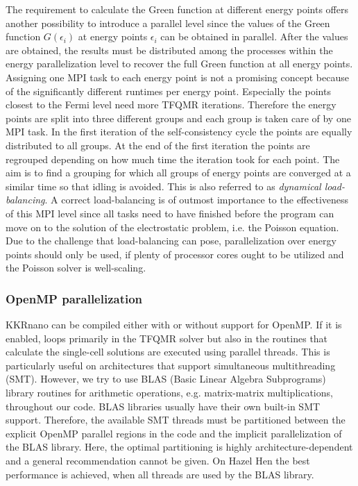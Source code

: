 \documentclass[graybox]{svmult}
\begin{document}
The requirement to calculate the Green function at different energy points offers another possibility to
introduce a parallel level since the values of the Green function $G(\epsilon_i)$ at energy points $\epsilon_i$
can be obtained in parallel.
After the values are obtained, the results must be distributed among the processes within
the energy parallelization level to recover the full Green function at all energy points.
Assigning one MPI task to each energy point is not a promising concept because
of the significantly different runtimes per energy point. Especially the points closest to the
Fermi level 
need more TFQMR iterations.
Therefore the energy points are split into three different groups and each group is taken care of by
one MPI task.
In the first iteration of the self-consistency cycle the points are equally distributed to all
groups. At the end of the first iteration the points are regrouped depending on how much time the iteration took
for each point. The aim is to find a grouping for which all groups of energy points are converged at
a similar time so that idling is avoided. This is also referred to as \textit{dynamical load-balancing}.
A correct load-balancing is of outmost importance to the effectiveness of this MPI level since
all tasks need to have finished before the program can move on to the solution of the electrostatic problem,
i.e. the Poisson equation.
Due to the challenge that load-balancing can pose, parallelization over energy points should only be used, 
if plenty of processor cores
ought to be utilized and the Poisson solver is well-scaling.

\subsubsection*{OpenMP parallelization}

KKRnano can be compiled either with or without support for OpenMP.
If it is enabled,
loops primarily in the TFQMR solver but also in the routines that calculate the single-cell
solutions are executed using parallel threads. 
This is particularly useful on architectures that support simultaneous multithreading (SMT).
However, we try to use BLAS (Basic Linear Algebra Subprograms) library routines for arithmetic
operations, e.g. matrix-matrix multiplications, throughout our code. BLAS libraries usually
have their own built-in SMT support.
Therefore, the available SMT threads must be partitioned between the explicit OpenMP 
parallel regions in the code and the implicit parallelization of the BLAS library.
Here, the optimal partitioning is highly architecture-dependent and a general recommendation cannot
be given. On Hazel Hen the best performance is achieved, when all threads are used by the BLAS library.
\end{document}
